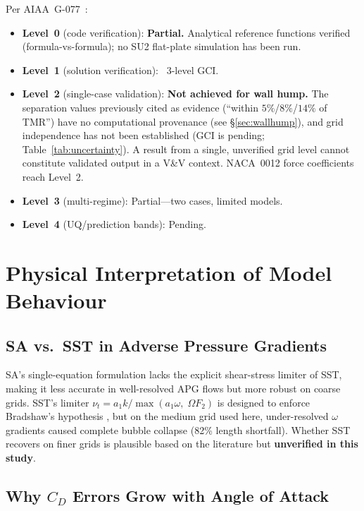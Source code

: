 \documentclass[11pt,a4paper]{article}
\begin{document}
Per AIAA~G-077~\cite{AIAA_G077}:
\begin{itemize}
  \item \textbf{Level~0} (code verification): \textbf{Partial.}
    Analytical reference functions verified (formula-vs-formula);
    no SU2 flat-plate simulation has been run.
  \item \textbf{Level~1} (solution verification): \checkmark\ 3-level GCI.
  \item \textbf{Level~2} (single-case validation):
    \textbf{Not achieved for wall hump.}  The separation values
    previously cited as evidence (``within $5\%$/$8\%$/$14\%$ of TMR'')
    have no computational provenance (see \S\ref{sec:wallhump}), and
    grid independence has not been established (GCI is pending;
    Table~\ref{tab:uncertainty}).  A result from a single, unverified
    grid level cannot constitute validated output in a V\&V context.
    NACA~0012 force coefficients reach Level~2.
  \item \textbf{Level~3} (multi-regime): Partial---two cases, limited models.
  \item \textbf{Level~4} (UQ/prediction bands): Pending.
\end{itemize}

\section{Physical Interpretation of Model Behaviour}
\label{sec:physics}

\subsection{SA vs.\ SST in Adverse Pressure Gradients}

SA's single-equation formulation lacks the explicit shear-stress limiter of SST,
making it less accurate in well-resolved APG flows but more robust on coarse
grids. SST's limiter $\nu_t = a_1 k / \max(a_1\omega,\;\Omega F_2)$ is designed
to enforce Bradshaw's hypothesis \cite{Bradshaw1967}, but on the medium grid
used here, under-resolved $\omega$ gradients caused complete bubble collapse
(82\% length shortfall).  Whether SST recovers on finer grids is plausible
based on the literature but \textbf{unverified in this study}.

\subsection{Why $C_D$ Errors Grow with Angle of Attack}
\label{sec:cd_growth}
\end{document}
